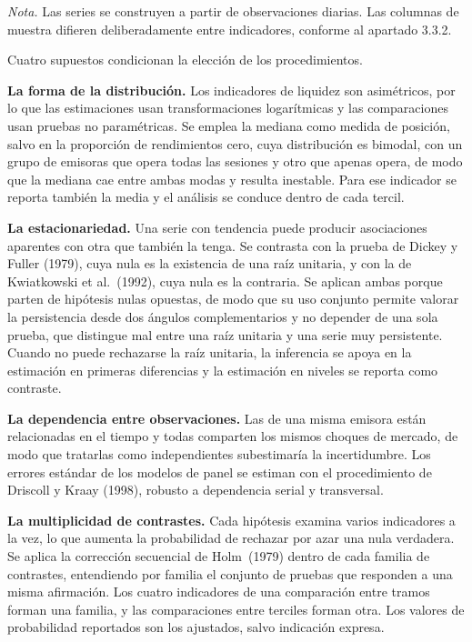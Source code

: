 \emph{Nota.} Las series se construyen a partir de observaciones diarias. Las columnas de muestra difieren deliberadamente entre indicadores, conforme al apartado 3.3.2.


Cuatro supuestos condicionan la elección de los procedimientos.

\textbf{La forma de la distribución.} Los indicadores de liquidez son asimétricos, por lo que las estimaciones usan transformaciones logarítmicas y las comparaciones usan pruebas no paramétricas. Se emplea la mediana como medida de posición, salvo en la proporción de rendimientos cero, cuya distribución es bimodal, con un grupo de emisoras que opera todas las sesiones y otro que apenas opera, de modo que la mediana cae entre ambas modas y resulta inestable. Para ese indicador se reporta también la media y el análisis se conduce dentro de cada tercil.

\textbf{La estacionariedad.} Una serie con tendencia puede producir asociaciones aparentes con otra que también la tenga. Se contrasta con la prueba de Dickey y Fuller (1979), cuya nula es la existencia de una raíz unitaria, y con la de Kwiatkowski et al.~(1992), cuya nula es la contraria. Se aplican ambas porque parten de hipótesis nulas opuestas, de modo que su uso conjunto permite valorar la persistencia desde dos ángulos complementarios y no depender de una sola prueba, que distingue mal entre una raíz unitaria y una serie muy persistente. Cuando no puede rechazarse la raíz unitaria, la inferencia se apoya en la estimación en primeras diferencias y la estimación en niveles se reporta como contraste.

\textbf{La dependencia entre observaciones.} Las de una misma emisora están relacionadas en el tiempo y todas comparten los mismos choques de mercado, de modo que tratarlas como independientes subestimaría la incertidumbre. Los errores estándar de los modelos de panel se estiman con el procedimiento de Driscoll y Kraay (1998), robusto a dependencia serial y transversal.

\textbf{La multiplicidad de contrastes.} Cada hipótesis examina varios indicadores a la vez, lo que aumenta la probabilidad de rechazar por azar una nula verdadera. Se aplica la corrección secuencial de Holm~(1979) dentro de cada familia de contrastes, entendiendo por familia el conjunto de pruebas que responden a una misma afirmación. Los cuatro indicadores de una comparación entre tramos forman una familia, y las comparaciones entre terciles forman otra. Los valores de probabilidad reportados son los ajustados, salvo indicación expresa.

